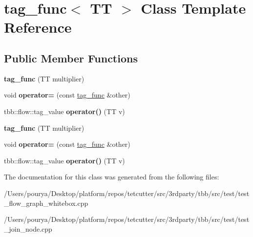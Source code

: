 \hypertarget{classtag__func}{}\section{tag\+\_\+func$<$ T\+T $>$ Class Template Reference}
\label{classtag__func}
\subsection*{Public Member Functions}
\begin{DoxyCompactItemize}
\item 
\hypertarget{classtag__func_a73107308d575d4a1ee238d42b2f17a28}{}{\bfseries tag\+\_\+func} (T\+T multiplier)\label{classtag__func_a73107308d575d4a1ee238d42b2f17a28}

\item 
\hypertarget{classtag__func_ad62481a1f111d26b37d2eeb5f2397cf4}{}void {\bfseries operator=} (const \hyperlink{classtag__func}{tag\+\_\+func} \&other)\label{classtag__func_ad62481a1f111d26b37d2eeb5f2397cf4}

\item 
\hypertarget{classtag__func_ac205a75f61371c60ede2a424448fac56}{}tbb\+::flow\+::tag\+\_\+value {\bfseries operator()} (T\+T v)\label{classtag__func_ac205a75f61371c60ede2a424448fac56}

\item 
\hypertarget{classtag__func_a73107308d575d4a1ee238d42b2f17a28}{}{\bfseries tag\+\_\+func} (T\+T multiplier)\label{classtag__func_a73107308d575d4a1ee238d42b2f17a28}

\item 
\hypertarget{classtag__func_ad62481a1f111d26b37d2eeb5f2397cf4}{}void {\bfseries operator=} (const \hyperlink{classtag__func}{tag\+\_\+func} \&other)\label{classtag__func_ad62481a1f111d26b37d2eeb5f2397cf4}

\item 
\hypertarget{classtag__func_ac205a75f61371c60ede2a424448fac56}{}tbb\+::flow\+::tag\+\_\+value {\bfseries operator()} (T\+T v)\label{classtag__func_ac205a75f61371c60ede2a424448fac56}

\end{DoxyCompactItemize}


The documentation for this class was generated from the following files\+:\begin{DoxyCompactItemize}
\item 
/\+Users/pourya/\+Desktop/platform/repos/tetcutter/src/3rdparty/tbb/src/test/test\+\_\+flow\+\_\+graph\+\_\+whitebox.\+cpp\item 
/\+Users/pourya/\+Desktop/platform/repos/tetcutter/src/3rdparty/tbb/src/test/test\+\_\+join\+\_\+node.\+cpp\end{DoxyCompactItemize}
